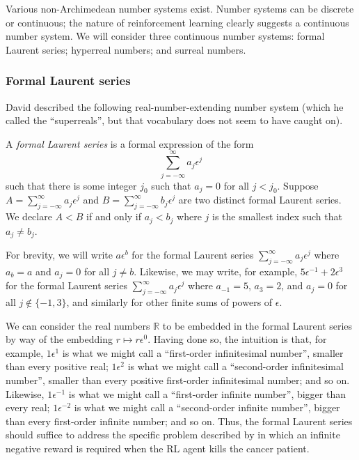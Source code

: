 \documentclass[twoside,11pt]{article}
\begin{document}
Various non-Archimedean number systems exist. Number systems can be
discrete or continuous; the nature of reinforcement learning clearly
suggests a continuous number system. We will consider three continuous
number systems: formal Laurent series; hyperreal numbers; and
surreal numbers.

\subsubsection{Formal Laurent series}

David \cite{tall1980looking} described the following
real-number-extending number system (which he called the ``superreals'', but
that vocabulary does not seem to have caught on).

\begin{definition}
A \emph{formal Laurent series} is a formal expression of the form
\[
\sum_{j=-\infty}^\infty a_j \epsilon^j
\]
such that there is some integer $j_0$ such that $a_j=0$ for all $j<j_0$.
Suppose $A=\sum_{j=-\infty}^\infty a_j\epsilon^j$
and $B=\sum_{j=-\infty}^\infty b_j\epsilon^j$ are two distinct formal Laurent series.
We declare $A<B$ if and only if $a_j<b_j$ where $j$ is the smallest
index such that $a_j\not=b_j$.
\end{definition}

For brevity, we will write $a\epsilon^b$ for the formal Laurent series
$\sum_{j=-\infty}^{\infty} a_j\epsilon^j$ where $a_b=a$ and $a_j=0$ for all $j\not=b$.
Likewise, we may write, for example, $5\epsilon^{-1}+2\epsilon^3$ for the
formal Laurent series $\sum_{j=-\infty}^{\infty} a_j\epsilon^j$ where $a_{-1}=5$,
$a_3=2$, and $a_j=0$ for all $j\not\in\{-1,3\}$, and similarly for other
finite sums of powers of $\epsilon$.

We can consider the real numbers $\mathbb R$ to be embedded in the formal Laurent
series by way of the embedding $r\mapsto r\epsilon^0$. Having done so, the intuition is that,
for example, $1\epsilon^1$ is what we might call a ``first-order
infinitesimal number'', smaller
than every positive real;
$1\epsilon^2$ is what we might call a ``second-order infinitesimal number'',
smaller than every
positive first-order infinitesimal number; and so on. Likewise,
$1\epsilon^{-1}$ is what we might call a ``first-order infinite number'', bigger than
every real; $1\epsilon^{-2}$ is what we might call a ``second-order infinite number'', bigger
than every first-order infinite number; and so on. Thus, the formal Laurent series
should suffice to address the specific problem described by
\cite{wirth2017survey} in which an infinite negative reward is required when the
RL agent kills the cancer patient.
\end{document}
